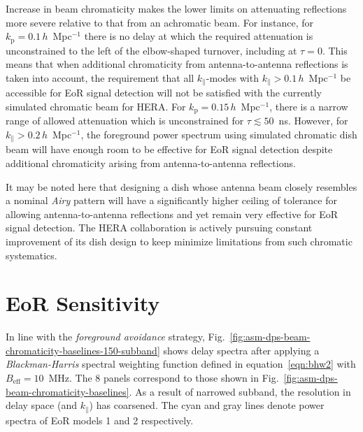 \documentclass[preprint2,iop,numberedappendix,twocolappendix,appendixfloats]{emulateapj}
\begin{document}
Increase in beam chromaticity makes the lower limits on attenuating reflections more severe relative to that from an achromatic beam. For instance, for $k_\textrm{p}=0.1\,h$~Mpc$^{-1}$ there is no delay at which the required attenuation is unconstrained to the left of the elbow-shaped turnover, including at $\tau=0$. This means that when additional chromaticity from antenna-to-antenna reflections is taken into account, the requirement that all $k_\parallel$-modes with $k_\parallel > 0.1\,h$~Mpc$^{-1}$ be accessible for EoR signal detection will not be satisfied with the currently simulated chromatic beam for HERA. For $k_\textrm{p}=0.15\,h$~Mpc$^{-1}$, there is a narrow range of allowed attenuation which is unconstrained for $\tau \lesssim 50$~ns. However, for $k_\parallel > 0.2\,h$~Mpc$^{-1}$, the foreground power spectrum using simulated chromatic dish beam will have enough room to be effective for EoR signal detection despite additional chromaticity arising from antenna-to-antenna reflections. 

It may be noted here that designing a dish whose antenna beam closely resembles a nominal {\it Airy} pattern will have a significantly higher ceiling of tolerance for allowing antenna-to-antenna reflections and yet remain very effective for EoR signal detection. The HERA collaboration is actively pursuing constant improvement of its dish design to keep minimize limitations from such chromatic systematics.

\section{EoR Sensitivity}\label{sec:eor-sensitivity}

In line with the {\it foreground avoidance} strategy, Fig.~\ref{fig:asm-dps-beam-chromaticity-baselines-150-subband} shows delay spectra after applying a {\it Blackman-Harris} spectral weighting function defined in equation~\ref{eqn:bhw2} with $B_\textrm{eff}=10$~MHz. The 8 panels correspond to those shown in Fig.~\ref{fig:asm-dps-beam-chromaticity-baselines}. As a result of narrowed subband, the resolution in delay space (and $k_\parallel$) has coarsened. The cyan and gray lines denote power spectra of EoR models 1 and 2 respectively. 
\end{document}
